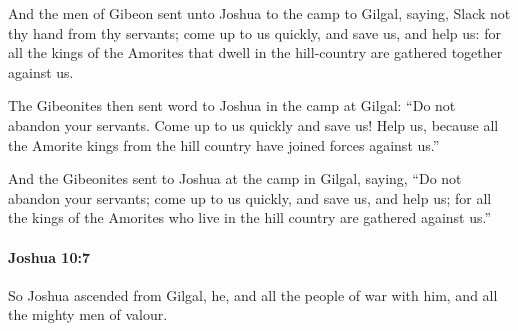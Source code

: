 			\begin{versebox}
					\item[BHS] 
					\item[ASV] And the men of Gibeon sent unto Joshua to the camp to Gilgal, saying, Slack not thy hand from thy servants; come up to us quickly, and save us, and help us: for all the kings of the Amorites that dwell in the hill-country are gathered together against us.
					\item[NIV] The Gibeonites then sent word to Joshua in the camp at Gilgal: “Do not abandon your servants. Come up to us quickly and save us! Help us, because all the Amorite kings from the hill country have joined forces against us.”
					\item[NRSV] And the Gibeonites sent to Joshua at the camp in Gilgal, saying, “Do not abandon your servants; come up to us quickly, and save us, and help us; for all the kings of the Amorites who live in the hill country are gathered against us.”
			\end{versebox}

		\paragraph{Joshua 10:7} %
			\label{JOSHUA-10-7}

			So Joshua ascended from Gilgal, he, and all the people of war with him, and all the mighty men of valour.

